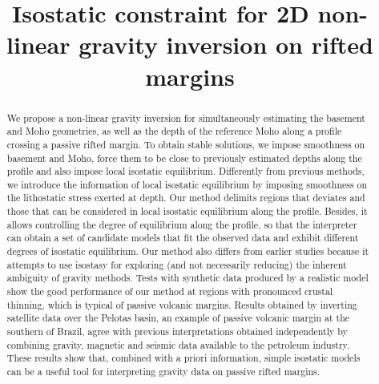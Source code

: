 \documentclass[manuscript,revised]{geophysics}
\begin{document}
\title{Isostatic constraint for 2D non-linear gravity inversion on rifted margins}

\renewcommand{\thefootnote}{\fnsymbol{footnote}} 


%

\maketitle

\begin{abstract}


We propose a non-linear gravity inversion for simultaneously estimating the 
basement and Moho geometries, as well as the depth of the reference Moho 
along a profile crossing a passive rifted margin. To obtain stable solutions, 
we impose smoothness on basement and Moho, force them to be close to previously 
estimated depths along the profile and also impose local isostatic equilibrium. 
Differently from previous methods, we introduce the information of local isostatic 
equilibrium by imposing smoothness on the lithostatic stress exerted at depth. 
Our method delimits regions that deviates and those that can be considered in local 
isostatic equilibrium along the profile. Besides, it allows controlling the 
degree of equilibrium along the profile, so that the interpreter can obtain a set of 
candidate models that fit the observed data and exhibit different degrees of 
isostatic equilibrium. Our method also differs from earlier studies because it 
attempts to use isostasy for exploring (and not necessarily reducing) the inherent 
ambiguity of gravity methods.
Tests with synthetic data produced by a realistic model show the good performance 
of our method at regions with pronounced crustal thinning, which is typical of 
passive volcanic margins. Results obtained by inverting satellite data over the 
Pelotas basin, an example of passive volcanic margin at the southern of Brazil, 
agree with previous interpretations obtained independently by combining gravity, 
magnetic and seismic data available to the petroleum industry. These results 
show that, combined with a priori information, simple isostatic models can be
a useful tool for interpreting gravity data on passive rifted margins.


\end{abstract}
\end{document}
